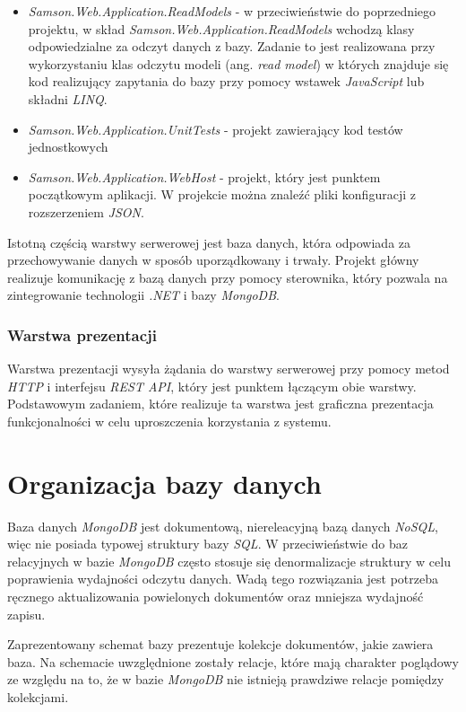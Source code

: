 \documentclass[a4paper,twoside,12pt]{book}
\newcommand{\obcy}[1]{\emph{#1}}
\newcommand{\ang}[1]{{\selectlanguage{british}\obcy{#1}}}
\begin{document}
\begin{itemize}
	\item \textit{Samson.Web.Application.ReadModels} - w przeciwieństwie do poprzedniego projektu, w skład \textit{Samson.Web.Application.ReadModels} wchodzą klasy odpowiedzialne za odczyt danych z bazy. Zadanie to jest realizowana przy wykorzystaniu klas odczytu modeli (ang. \ang{read model}) w których znajduje się kod realizujący zapytania do bazy przy pomocy wstawek \textit{JavaScript} lub składni \textit{LINQ}.
	\item \textit{Samson.Web.Application.UnitTests} - projekt zawierający kod testów jednostkowych
	\item \textit{Samson.Web.Application.WebHost} - projekt, który jest punktem początkowym aplikacji. W projekcie można znaleźć pliki konfiguracji z rozszerzeniem \textit{JSON}.
\end{itemize}
Istotną częścią warstwy serwerowej jest baza danych, która odpowiada za przechowywanie danych w sposób uporządkowany i trwały. Projekt główny realizuje komunikację z bazą danych przy pomocy sterownika, który pozwala na zintegrowanie technologii \textit{.NET} i bazy \textit{MongoDB}.

\subsubsection{Warstwa prezentacji}
Warstwa prezentacji wysyła żądania do warstwy serwerowej przy pomocy metod \textit{HTTP} i interfejsu \textit{REST API}, który jest punktem łączącym obie warstwy. Podstawowym zadaniem, które realizuje ta warstwa jest graficzna prezentacja funkcjonalności w celu uproszczenia korzystania z systemu.


\section{Organizacja bazy danych}
Baza danych \textit{MongoDB} jest dokumentową, niereleacyjną bazą danych \textit{NoSQL}, więc nie posiada typowej struktury bazy \textit{SQL}. W przeciwieństwie do baz relacyjnych w bazie \textit{MongoDB} często stosuje się denormalizacje struktury w celu poprawienia wydajności odczytu danych. Wadą tego rozwiązania jest potrzeba ręcznego aktualizowania powielonych dokumentów oraz mniejsza wydajność zapisu.

Zaprezentowany schemat bazy prezentuje kolekcje dokumentów, jakie zawiera baza. Na schemacie uwzględnione zostały relacje, które mają charakter poglądowy ze względu na to, że w bazie \textit{MongoDB} nie istnieją prawdziwe relacje pomiędzy kolekcjami.
\end{document}
